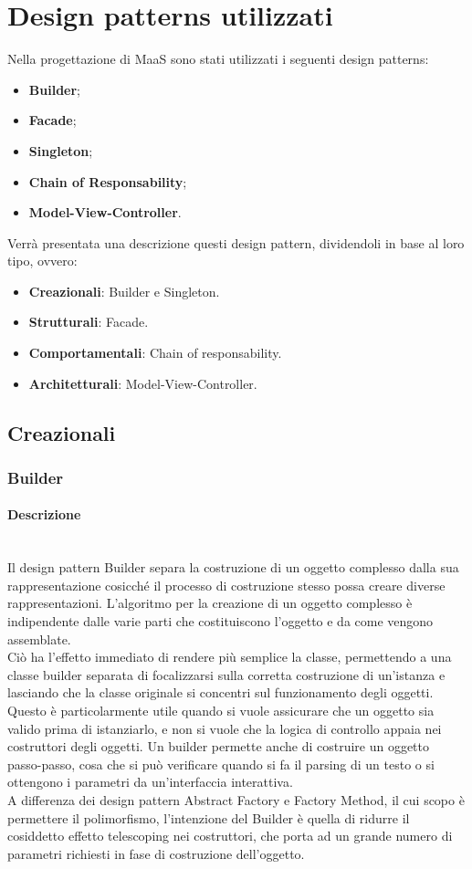 \newpage
\section{Design patterns utilizzati}
Nella progettazione di MaaS sono stati utilizzati i seguenti design patterns:
\begin{itemize}
\item \textbf{Builder};
\item \textbf{Facade};
\item \textbf{Singleton};
\item \textbf{Chain of Responsability};
\item \textbf{Model-View-Controller}.
\end{itemize}
Verrà presentata una descrizione questi design pattern, dividendoli in base al loro tipo, ovvero:
\begin{itemize}
\item \textbf{Creazionali}: Builder e Singleton.
\item \textbf{Strutturali}: Facade.
\item \textbf{Comportamentali}: Chain of responsability.
\item \textbf{Architetturali}: Model-View-Controller.
\end{itemize}
\subsection{Creazionali}
\subsubsection{Builder}
\paragraph{Descrizione} \mbox{} \\
Il design pattern Builder separa la costruzione di un oggetto complesso dalla sua rappresentazione cosicché il processo di costruzione stesso possa creare diverse rappresentazioni. L'algoritmo per la creazione di un oggetto complesso è indipendente dalle varie parti che costituiscono l'oggetto e da come vengono assemblate. \\
Ciò ha l'effetto immediato di rendere più semplice la classe, permettendo a una classe builder separata di focalizzarsi sulla corretta costruzione di un'istanza e lasciando che la classe originale si concentri sul funzionamento degli oggetti. Questo è particolarmente utile quando si vuole assicurare che un oggetto sia valido prima di istanziarlo, e non si vuole che la logica di controllo appaia nei costruttori degli oggetti. Un builder permette anche di costruire un oggetto passo-passo, cosa che si può verificare quando si fa il parsing di un testo o si ottengono i parametri da un'interfaccia interattiva. \\
A differenza dei design pattern Abstract Factory e Factory Method, il cui scopo è permettere il polimorfismo, l'intenzione del Builder è quella di ridurre il cosiddetto effetto telescoping nei costruttori, che porta ad un grande numero di parametri richiesti in fase di costruzione dell'oggetto.
